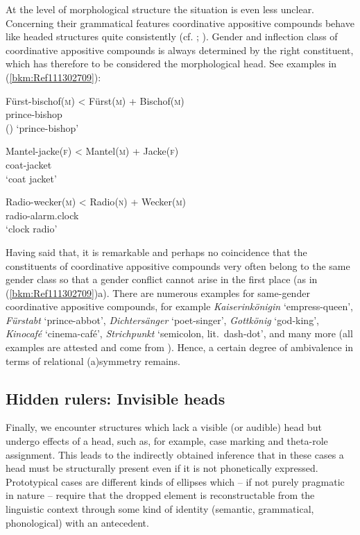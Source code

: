 \documentclass[output=paper
  ,nobabel
  ,draftmode
  ,colorlinks, citecolor=brown
]{langscibook}
\begin{document}
At the level of morphological structure the situation is even less unclear. Concerning their
grammatical features coordinative appositive compounds behave like headed structures quite
consistently (cf. \citealt[143]{Olsen1990b}; \citealt[369]{Olsen2015b}). Gender and inflection class
of  coordinative appositive compounds is always determined by the right constituent, which has
therefore to be considered the morphological head. See  examples in (\ref{bkm:Ref111302709}):

\eal

\label{bkm:Ref111302709}
\ex 
\gll Fürst-bischof\textsc{(m)}  <  Fürst\textsc{(m)} + Bischof\textsc{(m)}\\
       prince-bishop\\\hfill()
\glt   `prince-bishop'

\ex
\gll Mantel-jacke\textsc{(f)}  <  Mantel\textsc{(m)} + Jacke\textsc{(f)}\\
       coat-jacket \\
\glt   `coat jacket'

\ex
\gll Radio-wecker\textsc{(m)}  <  Radio\textsc{(n)} + Wecker\textsc{(m)}\\
       radio-alarm.clock \\
\glt   `clock radio'
\zl

\noindent
Having said that, it is remarkable and perhaps no coincidence that the constituents of coordinative
appositive compounds very often belong to the same gender class so that a gender conflict cannot
arise in the first place (as in (\ref{bkm:Ref111302709})a). There are numerous examples for
same-gender coordinative appositive compounds, for example \emph{Kaiserinkönigin} `empress-queen',
\emph{Fürstabt} `prince-abbot', \emph{Dichtersänger} `poet-singer', \emph{Gottkönig} `god-king',
\emph{Kinocafé} `cinema-café', \emph{Strichpunkt} `semicolon, lit.\ dash-dot', and many more (all
examples are attested and come from \citealt[34]{BreindlThurmair1992}). Hence, a certain degree of
ambivalence in terms of relational (a)symmetry remains.

\subsection{Hidden rulers: Invisible heads}

Finally, we encounter structures which lack a visible (or audible) head but undergo effects of a
head, such as, for example, case marking and theta-role assignment. This leads to the indirectly
obtained inference that in these cases a head must be structurally present even if it is not
phonetically expressed. Prototypical cases are different kinds of ellipses which – if not purely
pragmatic in nature – require that the dropped element is reconstructable from the linguistic
context through some kind of identity (semantic, grammatical, phonological) with an antecedent.
\end{document}
